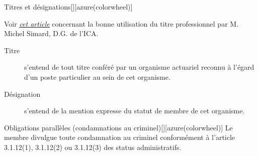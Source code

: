 \documentclass[10pt, french]{article}
\begin{document}
\begin{multicols*}{2}
\begin{definitionGENERAL}{Titres et désignations}[][azure(colorwheel)]
\bigskip

\begin{rappel_enhanced}[Ressource]
Voir \textit{\color{bleudefrance}\underline{\hyperlink{http://www.naylornetwork.com/cia-nwl/articles/index-fr-v6.asp?aid=606558&issueID=63257}{\color{bleudefrance} cet article}}} concernant la bonne utilisation du titre professionnel par M. Michel Simard, D.G. de l'ICA.
\end{rappel_enhanced}
\end{definitionGENERAL}

\begin{definitionNOHFILLsub}[Annotation 10-1]
\begin{description}
	\item[Titre]	s’entend de tout titre conféré par un organisme actuariel reconnu à l’égard d’un poste particulier au sein de cet organisme. 
	\item[Désignation]	s’entend de la mention expresse du statut de membre de cet organisme. 
\end{description}
\end{definitionNOHFILLsub}

\bigskip

\begin{definitionGENERAL}{Obligations parallèles (condamnations au criminel)}[][azure(colorwheel)]
Le membre divulgue toute condamnation au criminel conformément à l'article 3.1.12(1), 3.1.12(2) ou 3.1.12(3) des status administratifs.
\end{definitionGENERAL}


\end{multicols*}
\end{document}
